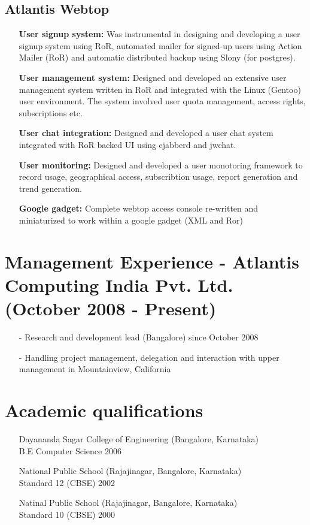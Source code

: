 \documentclass[a4paper,11pt]{article}
\begin{document}
\subsection{Atlantis Webtop}
\begin{itemize}
  \item[] \textbf{User signup system: }Was instrumental in designing
    and developing a user signup system using RoR, automated mailer for
    signed-up users using Action Mailer (RoR) and automatic distributed backup using Slony (for postgres).
  \item[] \textbf{User management system: }Designed and developed an
    extensive user management system written in RoR and integrated
    with the Linux (Gentoo) user environment. The system involved user
    quota management, access rights, subscriptions etc.
  \item[] \textbf{User chat integration: } Designed and developed a user chat system integrated with RoR backed UI using ejabberd and jwchat.
  \item[] \textbf{User monitoring: }Designed and developed a user
    monotoring framework to record usage, geographical access,
    subscribtion usage, report generation and trend generation.
  \item[] \textbf{Google gadget: }Complete webtop access console re-written and miniaturized to work within a google gadget (XML and Ror)
\end{itemize}

\section{Management Experience - Atlantis Computing India
  Pvt. Ltd. (October 2008 - Present)}
\begin{itemize}
  \item[-] Research and development lead (Bangalore) since October
    2008
  \item[-] Handling project management, delegation and interaction
    with upper management in Mountainview, California
\end{itemize}

\section{Academic qualifications}

\begin{itemize}
  \item[] Dayananda Sagar College of Engineering (Bangalore,
  Karnataka)\\ B.E Computer Science \hfill 2006
  \item[] National Public School (Rajajinagar, Bangalore,
  Karnataka)\\ Standard 12 (CBSE) \hfill 2002
  \item[] Natinal Public School (Rajajinagar, Bangalore,
  Karnataka)\\ Standard 10 (CBSE) \hfill 2000
\end{itemize}
\end{document}

